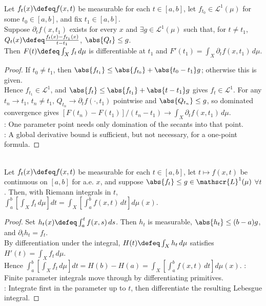 \begin{corollary} \label{cor:single-point-differentiation-under-lebesgue-integral} \\
Let $f_t(x)\defeq f(x,t)$ be measurable for each $t\in[a,b]$, let $f_{t_0}\in\mathscr{L}^1(\mu)$ for some $t_0\in[a,b]$, and fix $t_1\in[a,b]$.\\
Suppose $\partial_tf(x,t_1)$ exists for every $x$ and $\exists g\in\mathscr{L}^1(\mu)$ such that, for $t\neq t_1$, $Q_t(x)\defeq\frac{f_t(x)-f_{t_1}(x)}{t-t_1}$, $\abs{Q_t}\leq g$.\\
Then $F(t)\defeq\int_Xf_t\,d\mu$ is differentiable at $t_1$ and $F'(t_1)=\int_X\partial_tf(x,t_1)\,d\mu$.
\begin{proof}
If $t_0\neq t_1$, then $\abs{f_{t_1}}\leq\abs{f_{t_0}}+\abs{t_0-t_1}g$; otherwise this is given.\\
Hence $f_{t_1}\in\mathscr{L}^1$, and $\abs{f_t}\leq\abs{f_{t_1}}+\abs{t-t_1}g$ gives $f_t\in\mathscr{L}^1$. For any $t_n\to t_1$, $t_n\neq t_1$, $Q_{t_n}\to\partial_tf(\cdot,t_1)$ pointwise and $\abs{Q_{t_n}}\leq g$, so dominated convergence gives $[F(t_n)-F(t_1)]/(t_n-t_1)\to\int_X\partial_tf(x,t_1)\,d\mu$.\\
: One parameter point needs only domination of the secants into that point.\\
: A global derivative bound is sufficient, but not necessary, for a one-point formula.
\end{proof}
\end{corollary}

\begin{corollary} \label{cor:riemann-parameter-integral-interchange} \\
Let $f_t(x)\defeq f(x,t)$ be measurable for each $t\in[a,b]$, let $t\mapsto f(x,t)$ be continuous on $[a,b]$ for a.e. $x$, and suppose $\abs{f_t}\leq g\in\mathscr{L}^1(\mu)$ $\forall t$. Then, with Riemann integrals in $t$, $\int_a^b\left[\int_X f_t\,d\mu\right]dt =\int_X\left[\int_a^b f(x,t)\,dt\right]d\mu(x)$.
\begin{proof}
Set $h_t(x)\defeq\int_a^t f(x,s)\,ds$. Then $h_t$ is measurable, $\abs{h_t}\leq(b-a)g$, and $\partial_th_t=f_t$.\\
By differentiation under the integral, $H(t)\defeq\int_Xh_t\,d\mu$ satisfies $H'(t)=\int_Xf_t\,d\mu$.\\
Hence $\int_a^b\left[\int_Xf_t\,d\mu\right]dt=H(b)-H(a)=\int_X\left[\int_a^b f(x,t)\,dt\right]d\mu(x)$.
: Finite parameter integrals move through by differentiating primitives.\\
: Integrate first in the parameter up to $t$, then differentiate the resulting Lebesgue integral.
\end{proof}
\end{corollary}

